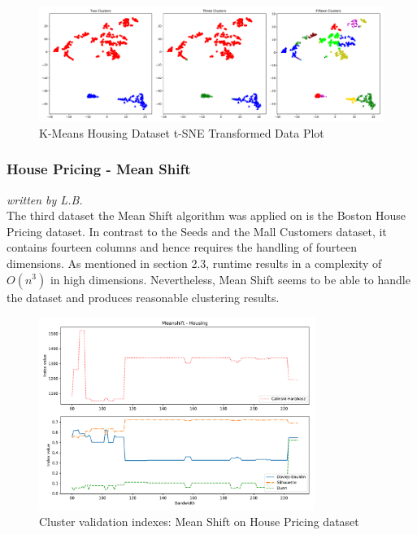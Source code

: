 \begin{figure}[H]
\caption{K-Means Housing Dataset t-SNE Transformed Data Plot}
\begin{center}
\includegraphics[width=1.0\textwidth]{images/kmeans_housing_tsne.pdf}
\end{center}
\label{fig:kmeans_housing_2d_comparison}
\end{figure}
\vspace{-0.5cm}

\subsubsection{House Pricing - Mean Shift}
\textit{written by L.B.}\\

The third dataset the Mean Shift algorithm was applied on is the Boston House Pricing dataset. In contrast to the Seeds and the Mall Customers dataset, it contains fourteen columns and hence requires the handling of fourteen dimensions. As mentioned in section 2.3, runtime results in a complexity of $O(n^{3})$ in high dimensions. 
Nevertheless, Mean Shift seems to be able to handle the dataset and produces reasonable clustering results. 

\begin{figure}[!ht]
\caption{Cluster validation indexes: Mean Shift on House Pricing dataset}
\begin{center}
\includegraphics[width=0.8\textwidth]{images/Meanshift_-_Housing.pdf}
\end{center}
\label{fig:meanshift_housing_indexes}
\end{figure}

